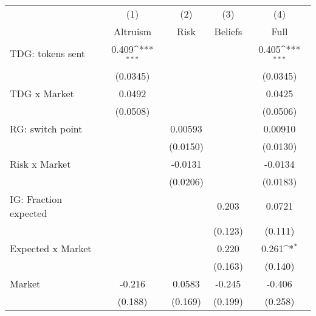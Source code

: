 {
\def\sym#1{\ifmmode^{#1}\else\(^{#1}\)\fi}
\begin{tabular}{l*{4}{c}}
\hline\hline
                    &\multicolumn{1}{c}{(1)}         &\multicolumn{1}{c}{(2)}         &\multicolumn{1}{c}{(3)}         &\multicolumn{1}{c}{(4)}         \\
                    &    Altruism         &        Risk         &     Beliefs         &        Full         \\
\hline
TDG: tokens sent    &       0.409\sym{***}&                     &                     &       0.405\sym{***}\\
                    &    (0.0345)         &                     &                     &    (0.0345)         \\
[1em]
TDG x Market        &      0.0492         &                     &                     &      0.0425         \\
                    &    (0.0508)         &                     &                     &    (0.0506)         \\
[1em]
RG: switch point    &                     &     0.00593         &                     &     0.00910         \\
                    &                     &    (0.0150)         &                     &    (0.0130)         \\
[1em]
Risk x Market       &                     &     -0.0131         &                     &     -0.0134         \\
                    &                     &    (0.0206)         &                     &    (0.0183)         \\
[1em]
IG: Fraction expected&                     &                     &       0.203         &      0.0721         \\
                    &                     &                     &     (0.123)         &     (0.111)         \\
[1em]
Expected x Market   &                     &                     &       0.220         &       0.261\sym{*}  \\
                    &                     &                     &     (0.163)         &     (0.140)         \\
[1em]
Market              &      -0.216         &      0.0583         &      -0.245         &      -0.406         \\
                    &     (0.188)         &     (0.169)         &     (0.199)         &     (0.258)         \\

\end{tabular}}
